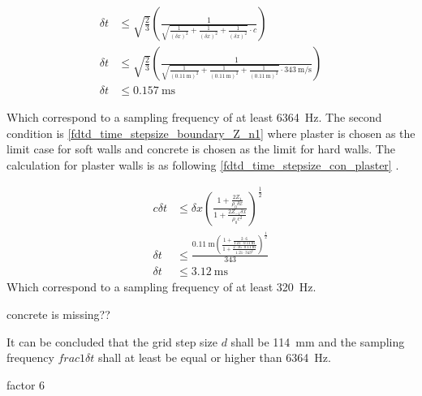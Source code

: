 
    \begin{subequations}\label{fdtd_time_stepsize_con_one}
\begin{alignat}{2}
\delta t &\leq \sqrt{\frac{2}{3}}  \left( \frac{1}{\sqrt{\frac{1}{(\delta x)^2}+\frac{1}{(\delta x)^2}+\frac{1}{(\delta x)^2} }\cdot c} \right)\\
\delta t &\leq \sqrt{\frac{2}{3}}  \left( \frac{1}{\sqrt{\frac{1}{(\SI{0.11}{\meter})^2}+\frac{1}{(\SI{0.11}{\meter})^2}+\frac{1}{(\SI{0.11}{\meter})^2} }\cdot \SI{343}{\meter\per\second}} \right)\\
\delta t &\leq \SI{0.157}{\milli\second} 
\end{alignat}
\end{subequations}
    
 Which correspond to a sampling frequency of at least \SI{6364}{\hertz}. The second condition is \autoref{fdtd_time_stepsize_boundary_Z_n1} where plaster is chosen as the limit case for soft walls and concrete is chosen as the limit for hard walls. The calculation for plaster walls is as following \autoref{fdtd_time_stepsize_con_plaster} \citep{finiteproblems}.
 
     \begin{subequations}\label{fdtd_time_stepsize_con_plaster}
\begin{alignat}{2}
c \delta t &\leq \delta x \left(   \frac{1+\frac{2Z_1}{\rho_0 \delta x}}{1+\frac{2Z_{-1} \delta x}{\rho_0 c^2}}  \right)^{\frac{1}{2}}\\
 \delta t &\leq \frac{\SI{0.11}{\meter} \left(   \frac{1+\frac{2\cdot 6}{1.21 \cdot \SI{0.11}{\meter}}}{1+\frac{2 \cdot 16 \cdot \SI{0.11}{\meter}}{1.21 \cdot {343}^2}}  \right)^{\frac{1}{2}}}{343}\\
\delta t &\leq \SI{3.12}{\milli\second} 
\end{alignat}
\end{subequations}
 Which correspond to a sampling frequency of at least \SI{320}{\hertz}.


concrete is missing??


It can be concluded that the grid step size $d$ shall be \SI{114}{\milli\meter} and the sampling frequency $frac{1}{\delta t}$ shall at least be equal or higher than \SI{6364}{\hertz}.

factor 6
